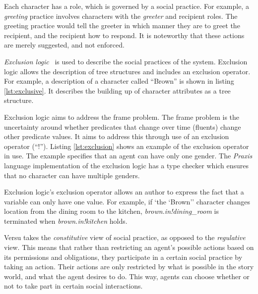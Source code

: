 Each character has a role, which is governed by a social practice. For example, a \emph{greeting} practice involves characters with the \emph{greeter} and recipient roles. The greeting practice would tell the greeter in which manner they are to greet the recipient, and the recipient how to respond. It is noteworthy that these actions are merely suggested, and not enforced.

\emph{Exclusion logic}~\cite{evans2010introducing} is used to describe the social practices of the system. Exclusion logic allows the description of tree structures and includes an exclusion operator. For example, a description of a character called ``Brown'' is shown in listing \ref{lst:exclusive}. It describes the building up of character attributes as a tree structure.

Exclusion logic aims to address the frame problem. The frame problem is the uncertainty around whether predicates that change over time (fluents) change other predicate values. It aims to address this through use of an exclusion operator (``!''). Listing \ref{lst:exclusion} shows an example of the exclusion operator in use. The example specifies that an agent can have only one gender. The \emph{Praxis} language implementation of the exclusion logic has a type checker which ensures that no character can have multiple genders.



Exclusion logic's exclusion operator allows an author to express the fact that a variable can only have one value. For example, if `the `Brown'' character changes location from the dining room to the kitchen, \emph{brown.in!dining\_room} is terminated when \emph{brown.in!kitchen} holds.

Versu takes the \emph{constitutive} view of social practice, as opposed to the \emph{regulative} view. This means that rather than restricting an agent's possible actions based on its permissions and obligations, they participate in a certain social practice by taking an action. Their actions are only restricted by what is possible in the story world, and what the agent desires to do. This way, agents can choose whether or not to take part in certain social interactions.

